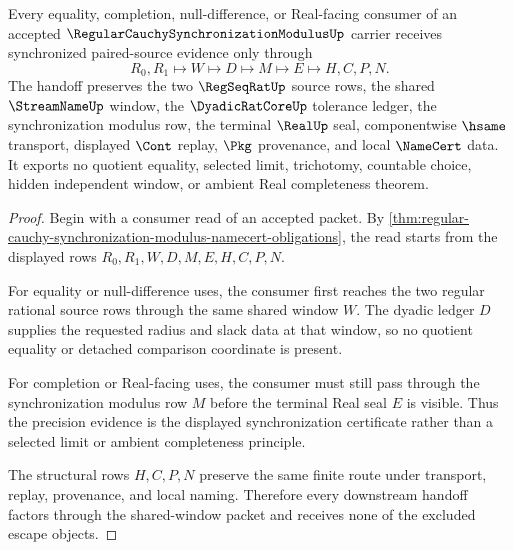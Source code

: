 \begin{theorem}
\label{thm:regular-cauchy-synchronization-modulus-shared-window-handoff}
Every equality, completion, null-difference, or Real-facing consumer of an accepted $\RegularCauchySynchronizationModulusUp$ carrier receives synchronized paired-source evidence only through
$$
R_0,R_1 \longmapsto W \longmapsto D \longmapsto M \longmapsto E \longmapsto H,C,P,N .
$$
The handoff preserves the two $\RegSeqRatUp$ source rows, the shared $\StreamNameUp$ window, the $\DyadicRatCoreUp$ tolerance ledger, the synchronization modulus row, the terminal $\RealUp$ seal, componentwise $\hsame$ transport, displayed $\Cont$ replay, $\Pkg$ provenance, and local $\NameCert$ data. It exports no quotient equality, selected limit, trichotomy, countable choice, hidden independent window, or ambient Real completeness theorem.
\end{theorem}
\begin{proof}
Begin with a consumer read of an accepted packet. By \autoref{thm:regular-cauchy-synchronization-modulus-namecert-obligations}, the read starts from the displayed rows $R_0,R_1,W,D,M,E,H,C,P,N$.

For equality or null-difference uses, the consumer first reaches the two regular rational source rows through the same shared window $W$. The dyadic ledger $D$ supplies the requested radius and slack data at that window, so no quotient equality or detached comparison coordinate is present.

For completion or Real-facing uses, the consumer must still pass through the synchronization modulus row $M$ before the terminal Real seal $E$ is visible. Thus the precision evidence is the displayed synchronization certificate rather than a selected limit or ambient completeness principle.

The structural rows $H,C,P,N$ preserve the same finite route under transport, replay, provenance, and local naming. Therefore every downstream handoff factors through the shared-window packet and receives none of the excluded escape objects.
\end{proof}


